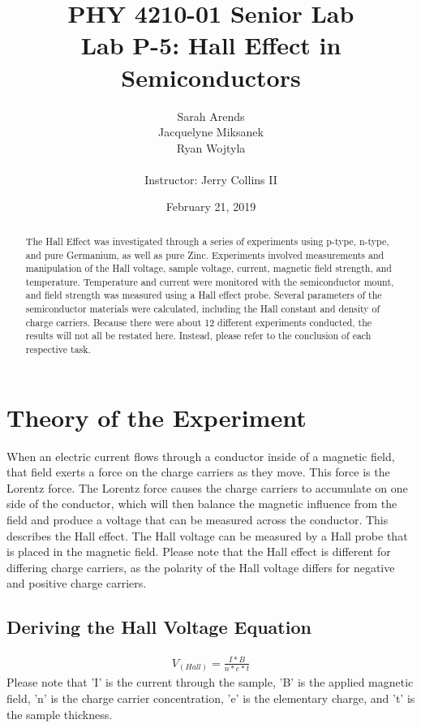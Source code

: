 \documentclass[a4paper]{article}
\title{PHY 4210-01 Senior Lab \\Lab P-5: Hall Effect in Semiconductors}
\author{Sarah Arends \\
        Jacquelyne Miksanek \\
        Ryan Wojtyla \\ \\
        Instructor: Jerry Collins II}
\date{February 21, 2019}
\begin{document}
\maketitle

\begin{abstract}
\qq The Hall Effect was investigated through a series of experiments
using p-type, n-type, and pure Germanium, as well as pure
Zinc. Experiments involved measurements and manipulation of the Hall
voltage, sample voltage, current, magnetic field strength, and
temperature. Temperature and current were monitored with the
semiconductor mount, and field strength was measured using a Hall
effect probe. Several parameters of the semiconductor materials were
calculated, including the Hall constant and density of charge
carriers. Because there were about 12 different experiments conducted,
the results will not all be restated here. Instead, please refer to the
conclusion of each respective task.
\end{abstract}

\newpage

\setcounter{tocdepth}{2}
\tableofcontents

\newpage

\section{Theory of the Experiment}

\qq When an electric current flows through a conductor inside of a
magnetic field, that field exerts a force on the charge carriers as
they move. This force is the Lorentz force. The Lorentz force causes
the charge carriers to accumulate on one side of the conductor, which
will then balance the magnetic influence from the field and produce a
voltage that can be measured across the conductor. This describes the
Hall effect. The Hall voltage can be measured by a Hall probe that is
placed in the magnetic field. Please note that the Hall effect is
different for differing charge carriers, as the polarity of the Hall
voltage differs for negative and positive charge carriers.

\subsection{Deriving the Hall Voltage Equation}

\begin{align*}
V_(Hall) = \frac{I*B}{n*e*t}
\end{align*}
\qq  Please note that 'I' is the current through the sample, 'B' is the
 applied magnetic field, 'n' is the charge carrier concentration, 'e'
 is the elementary charge, and 't' is the sample thickness.
\end{document}
